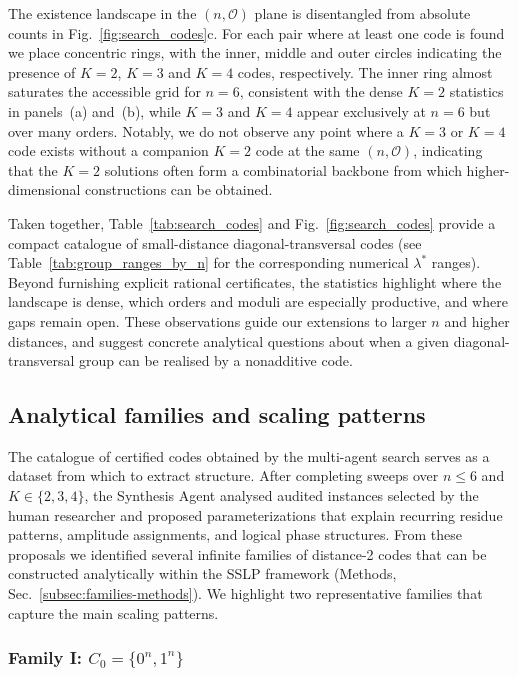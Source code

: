 \documentclass[pdflatex,sn-nature]{sn-jnl}%
\theoremstyle{thmstyleone}%
\theoremstyle{thmstyletwo}%
\theoremstyle{thmstylethree}%
\begin{document}
The existence landscape in the $(n,\mathcal{O})$ plane is disentangled from absolute counts in Fig.~\ref{fig:search_codes}c. For each pair where at least one code is found we place concentric rings, with the inner, middle and outer circles indicating the presence of $K=2$, $K=3$ and $K=4$ codes, respectively. The inner ring almost saturates the accessible grid for $n=6$, consistent with the dense $K=2$ statistics in panels~(a) and~(b), while $K=3$ and $K=4$ appear exclusively at $n=6$ but over many orders. Notably, we do not observe any point where a $K=3$ or $K=4$ code exists without a companion $K=2$ code at the same $(n,\mathcal{O})$, indicating that the $K=2$ solutions often form a combinatorial backbone from which higher-dimensional constructions can be obtained.

Taken together, Table~\ref{tab:search_codes} and Fig.~\ref{fig:search_codes} provide a compact catalogue of small-distance diagonal-transversal codes (see Table~\ref{tab:group_ranges_by_n} for the corresponding numerical $\lambda^*$ ranges). Beyond furnishing explicit rational certificates, the statistics highlight where the landscape is dense, which orders and moduli are especially productive, and where gaps remain open. These observations guide our extensions to larger $n$ and higher distances, and suggest concrete analytical questions about when a given diagonal-transversal group can be realised by a nonadditive code.

\subsection{Analytical families and scaling patterns}
\label{subsec:families}

The catalogue of certified codes obtained by the multi-agent search serves as a dataset from which to extract structure. After completing sweeps over $n\le 6$ and $K\in\{2,3,4\}$, the Synthesis Agent analysed audited instances selected by the human researcher and proposed parameterizations that explain recurring residue patterns, amplitude assignments, and logical phase structures. From these proposals we identified several infinite families of distance-2 codes that can be constructed analytically within the SSLP framework (Methods, Sec.~\ref{subsec:families-methods}). We highlight two representative families that capture the main scaling patterns.

\subsubsection{Family I: $C_0=\{0^n,1^n\}$}
\label{subsubsec:family1}
\end{document}

